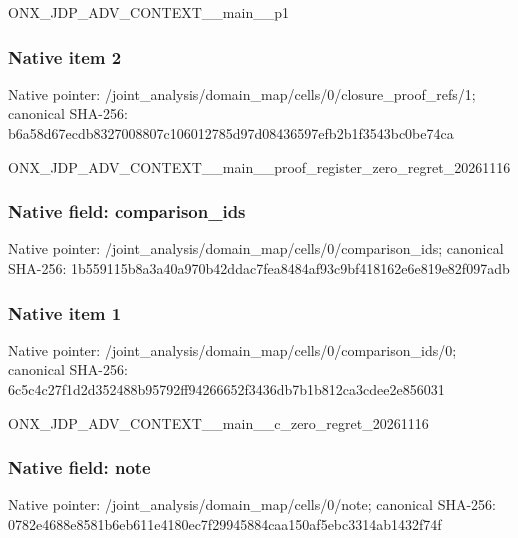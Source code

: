 \documentclass[10pt,a4paper]{article}
\begin{document}
\begingroup\raggedright\sloppy ONX\_\allowbreak{}JDP\_\allowbreak{}ADV\_\allowbreak{}CONTEXT\_\allowbreak{}\_\allowbreak{}main\_\allowbreak{}\_\allowbreak{}p1\par\endgroup

\subsubsection{Native item 2}
Native pointer: /joint\_\allowbreak{}analysis/domain\_\allowbreak{}map/cells/0/closure\_\allowbreak{}proof\_\allowbreak{}refs/1; canonical SHA-256: b6a58d67ecdb8327008807c106012785d97d08436597efb2b1f3543bc0be74ca

\begingroup\raggedright\sloppy ONX\_\allowbreak{}JDP\_\allowbreak{}ADV\_\allowbreak{}CONTEXT\_\allowbreak{}\_\allowbreak{}main\_\allowbreak{}\_\allowbreak{}proof\_\allowbreak{}register\_\allowbreak{}zero\_\allowbreak{}regret\_\allowbreak{}20261116\par\endgroup

\subsubsection{Native field: comparison\_\allowbreak{}ids}
Native pointer: /joint\_\allowbreak{}analysis/domain\_\allowbreak{}map/cells/0/comparison\_\allowbreak{}ids; canonical SHA-256: 1b559115b8a3a40a970b42ddac7fea8484af93c9bf418162e6e819e82f097adb

\subsubsection{Native item 1}
Native pointer: /joint\_\allowbreak{}analysis/domain\_\allowbreak{}map/cells/0/comparison\_\allowbreak{}ids/0; canonical SHA-256: 6c5c4c27f1d2d352488b95792ff94266652f3436db7b1b812ca3cdee2e856031

\begingroup\raggedright\sloppy ONX\_\allowbreak{}JDP\_\allowbreak{}ADV\_\allowbreak{}CONTEXT\_\allowbreak{}\_\allowbreak{}main\_\allowbreak{}\_\allowbreak{}c\_\allowbreak{}zero\_\allowbreak{}regret\_\allowbreak{}20261116\par\endgroup

\subsubsection{Native field: note}
Native pointer: /joint\_\allowbreak{}analysis/domain\_\allowbreak{}map/cells/0/note; canonical SHA-256: 0782e4688e8581b6eb611e4180ec7f29945884caa150af5ebc3314ab1432f74f
\end{document}
